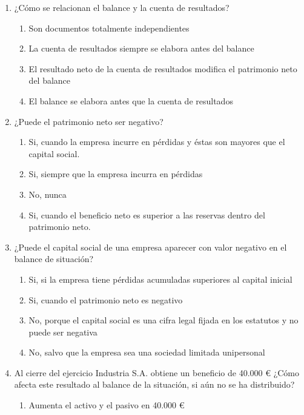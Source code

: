 \begin{enumerate}
\begin{enumerate}
        \item En el patrimonio neto
        \item En los ingresos anticipados
    \end{enumerate}
    \item ¿Cómo se relacionan el balance y la cuenta de resultados?
    \begin{enumerate}
        \item Son documentos totalmente independientes
        \item La cuenta de resultados siempre se elabora antes del balance
        \item El resultado neto de la cuenta de resultados modifica el patrimonio neto del balance
        \item El balance se elabora antes que la cuenta de resultados
    \end{enumerate}
    \item ¿Puede el patrimonio neto ser negativo?
    \begin{enumerate}
        \item Si, cuando la empresa incurre en pérdidas y éstas son mayores que el capital social.
        \item Si, siempre que la empresa incurra en pérdidas
        \item No, nunca
        \item Si, cuando el beneficio neto es superior a las reservas dentro del patrimonio neto.
    \end{enumerate}
    \item ¿Puede el capital social de una empresa aparecer con valor negativo en el balance de situación?
    \begin{enumerate}
        \item Si, si la empresa tiene pérdidas acumuladas superiores al capital inicial
        \item Si, cuando el patrimonio neto es negativo
        \item No, porque el capital social es una cifra legal fijada en los estatutos y no puede ser negativa
        \item No, salvo que la empresa sea una sociedad limitada unipersonal
    \end{enumerate}
    \item Al cierre del ejercicio Industria S.A. obtiene un beneficio de 40.000 € ¿Cómo afecta este resultado al balance de la situación, si aún no se ha distribuido?
    \begin{enumerate}
        \item Aumenta el activo y el pasivo en 40.000 €

\end{enumerate}
\end{enumerate}
